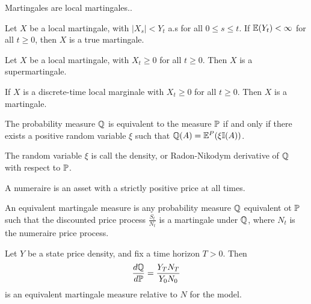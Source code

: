 \begin{thm}
  \label{sec:arbitrage-theory-12}
  Martingales are local martingales..
\end{thm}

\begin{thm}
  \label{sec:arbitrage-theory-13}
  Let $X$ be a local martingale, with $|X_{s}| < Y_{t}$ a.s for all $0
  \leq s \leq t$.  If $\E{Y_{t}} < \infty$ for all $t \geq 0$, then
  $X$ is a true martingale.
\end{thm}

\begin{thm}
  \label{sec:arbitrage-theory-15}
  Let $X$ be a local martingale, with $X_{t} \geq 0$ for all $t \geq
  0$.  Then $X$ is a supermartingale.
\end{thm}

\begin{thm}
  \label{sec:arbitrage-theory-16}
  If $X$ is a discrete-time local marginale with $X_{t} \geq 0$ for
  all $t \geq 0$. Then $X$ is a martingale.
\end{thm}

\begin{thm}
  \label{sec:arbitrage-theory-18}
  The probability measure $\Q$ is equivalent to the measure $\Prob$ if
  and only if there exists a positive random variable $\xi$ such that
  $\Q{A} = \E^{P}(\xi \I{A})$.

  The random variable $\xi$ is call the density, or Radon-Nikodym
  derivative of $\Q$ with respect to $\Prob$.
\end{thm}

\begin{defn}
  \label{sec:arbitrage-theory-19}
  A numeraire is an asset with a strictly positive price at all times.
\end{defn}

\begin{defn}
  \label{sec:arbitrage-theory-20}
  An equivalent martingale measure is any probability measure $\Q$
  equivalent ot $\Prob$ such that the discounted price process
  $\frac{S_{t}}{N_{t}}$ is a martingale under $\Q$, where $N_{t}$ is
  the numeraire price process.
\end{defn}

\begin{defn}
  \label{sec:arbitrage-theory-21}
  Let $Y$ be a state price density, and fix a time horizon $T > 0$.
  Then
  \begin{equation}
    \label{eq:4}
    \frac{d\Q}{d\Prob} = \frac{Y_{T} N_{T}}{Y_{0} N_{0}}
  \end{equation}
  is an equivalent martingale measure relative to $N$ for the model.
\end{defn}

